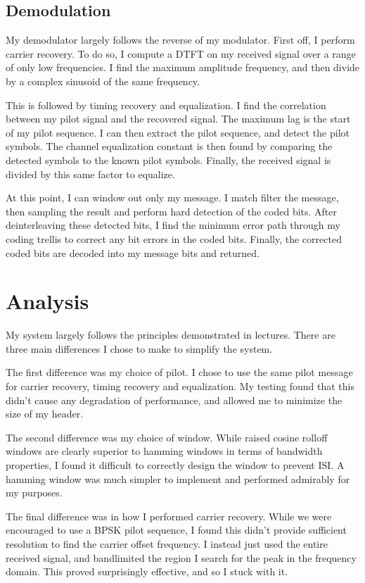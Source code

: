 \documentclass[11pt]{scrartcl}
\begin{document}
\subsection*{Demodulation}

My demodulator largely follows the reverse of my modulator. First off, I perform
carrier recovery. To do so, I compute a DTFT on my received signal over a range
of only low frequencies. I find the maximum amplitude frequency, and then divide
by a complex sinusoid of the same frequency.

This is followed by timing recovery and equalization. I find the correlation
between my pilot signal and the recovered signal. The maximum lag is the start
of my pilot sequence. I can then extract the pilot sequence, and detect the
pilot symbols. The channel equalization constant is then found by comparing the
detected symbols to the known pilot symbols. Finally, the received signal is
divided by this same factor to equalize.

At this point, I can window out only my message. I match filter the message,
then sampling the result and perform hard detection of the coded bits. After
deinterleaving these detected bits, I find the minimum error path through my
coding trellis to correct any bit errors in the coded bits. Finally, the
corrected coded bits are decoded into my message bits and returned.




\section*{Analysis}

My system largely follows the principles demonstrated in lectures. There are
three main differences I chose to make to simplify the system.

The first difference was my choice of pilot. I chose to use the same pilot
message for carrier recovery, timing recovery and equalization. My testing found
that this didn't cause any degradation of performance, and allowed me to
minimize the size of my header.

The second difference was my choice of window. While raised cosine rolloff
windows are clearly superior to hamming windows in terms of bandwidth
properties, I found it difficult to correctly design the window to prevent ISI.
A hamming window was much simpler to implement and performed admirably for my
purposes.

The final difference was in how I performed carrier recovery. While we were
encouraged to use a BPSK pilot sequence, I found this didn't provide sufficient
resolution to find the carrier offset frequency. I instead just used the entire
received signal, and bandlimited the region I search for the peak in the
frequency domain. This proved surprisingly effective, and so I stuck with it.
\end{document}

